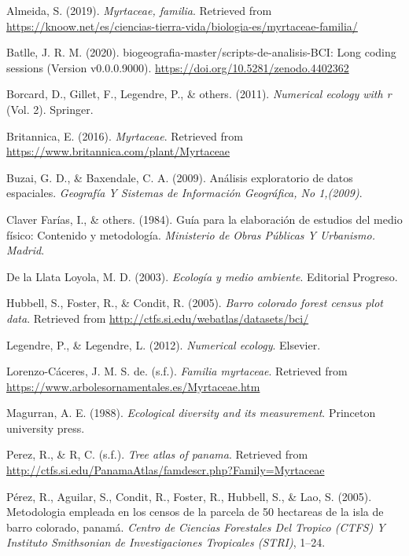 \documentclass[11pt,]{article}
\begin{document}
\hypertarget{refs}{}
\hypertarget{ref-sandra2019myrtaceae}{}
Almeida, S. (2019). \emph{Myrtaceae, familia}. Retrieved from
\url{https://knoow.net/es/ciencias-tierra-vida/biologia-es/myrtaceae-familia/}

\hypertarget{ref-jose_ramon_martinez_batlle_2020_4402362}{}
Batlle, J. R. M. (2020). biogeografia-master/scripts-de-analisis-BCI:
Long coding sessions (Version v0.0.0.9000).
\url{https://doi.org/10.5281/zenodo.4402362}

\hypertarget{ref-borcard2011numerical}{}
Borcard, D., Gillet, F., Legendre, P., \& others. (2011).
\emph{Numerical ecology with r} (Vol. 2). Springer.

\hypertarget{ref-encymyrtaceae}{}
Britannica, E. (2016). \emph{Myrtaceae}. Retrieved from
\url{https://www.britannica.com/plant/Myrtaceae}

\hypertarget{ref-buzai2009analisis}{}
Buzai, G. D., \& Baxendale, C. A. (2009). Análisis exploratorio de datos
espaciales. \emph{Geografía Y Sistemas de Información Geográfica, No
1,(2009)}.

\hypertarget{ref-claver1984guia}{}
Claver Farías, I., \& others. (1984). Guía para la elaboración de
estudios del medio físico: Contenido y metodología. \emph{Ministerio de
Obras Públicas Y Urbanismo. Madrid}.

\hypertarget{ref-de2003ecologia}{}
De la Llata Loyola, M. D. (2003). \emph{Ecología y medio ambiente}.
Editorial Progreso.

\hypertarget{ref-Hubbell2005barro}{}
Hubbell, S., Foster, R., \& Condit, R. (2005). \emph{Barro colorado
forest census plot data}. Retrieved from
\url{http://ctfs.si.edu/webatlas/datasets/bci/}

\hypertarget{ref-legendre2012numerical}{}
Legendre, P., \& Legendre, L. (2012). \emph{Numerical ecology}.
Elsevier.

\hypertarget{ref-josemyrtaceae}{}
Lorenzo-Cáceres, J. M. S. de. (s.f.). \emph{Familia myrtaceae}.
Retrieved from \url{https://www.arbolesornamentales.es/Myrtaceae.htm}

\hypertarget{ref-magurran1988ecological}{}
Magurran, A. E. (1988). \emph{Ecological diversity and its measurement}.
Princeton university press.

\hypertarget{ref-pereztree}{}
Perez, R., \& R, C. (s.f.). \emph{Tree atlas of panama}. Retrieved from
\url{http://ctfs.si.edu/PanamaAtlas/famdescr.php?Family=Myrtaceae}

\hypertarget{ref-perez2005metodologia}{}
Pérez, R., Aguilar, S., Condit, R., Foster, R., Hubbell, S., \& Lao, S.
(2005). Metodologia empleada en los censos de la parcela de 50 hectareas
de la isla de barro colorado, panamá. \emph{Centro de Ciencias
Forestales Del Tropico (CTFS) Y Instituto Smithsonian de Investigaciones
Tropicales (STRI)}, 1--24.
\end{document}
